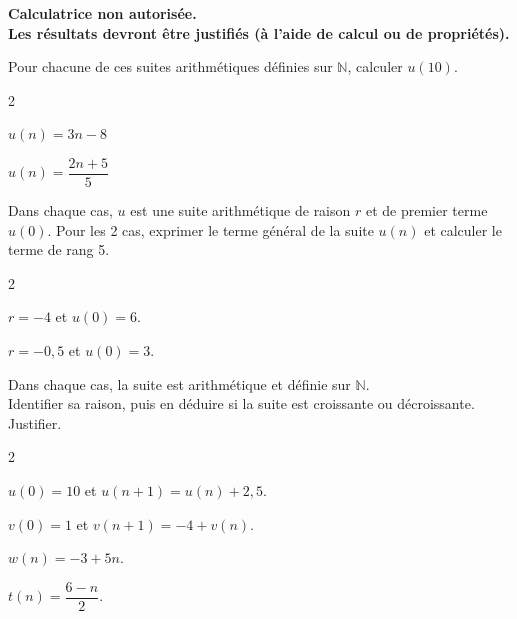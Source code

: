 \documentclass[11pt,a4paper]{article}  %
\begin{document}
	\graphicspath{{images/}}

	\begin{center}
	\end{center}

\begin{center}\textbf{Calculatrice non autorisée.\\Les résultats devront être justifiés (à l'aide de calcul ou de propriétés).}\end{center}


\exerciceDS{}
Pour chacune de ces suites arithmétiques définies sur $\mathbb{N}$, calculer $u(10)$.
\begin{multicols}{2}
	\begin{enumMet}
		\item {} $u(n)=3 n-8$
		\item $u(n)=\dfrac{2 n+5}{5}$
	\end{enumMet}
\end{multicols}

\exerciceDS{}
Dans chaque cas, $u$ est une suite arithmétique de raison $r$ et de premier terme $u(0)$. Pour les 2 cas, exprimer le terme général de la suite $u(n)$ et calculer le terme de rang 5.
\begin{multicols}{2}
	\begin{enumMet}
		\item $r=-4$ et $u(0)=6$.
		\item {} $r=-0,5$ et $u(0)=3$.
	\end{enumMet}
\end{multicols}


\exerciceDS{}
Dans chaque cas, la suite est arithmétique et définie sur $\mathbb{N}$.\\
Identifier sa raison, puis en déduire si la suite est croissante ou décroissante. Justifier.
\begin{multicols}{2}
	\begin{enumMet}
		\item $u(0)=10$ et $u(n+1)=u(n)+2,5$.
		\item $v(0)=1$ et $v(n+1)=-4+v(n)$.
		\item $w(n)=-3+5n$.
		\item {} $t(n)=\dfrac{6-n}{2}$.
	\end{enumMet}
\end{multicols}
\end{document}
